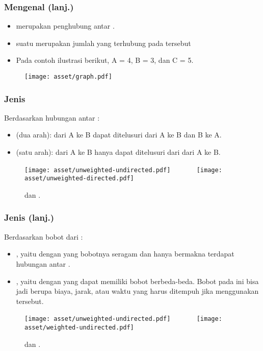 \begin{frame}
\frametitle{Mengenal \fGraph (lanj.)}
\begin{itemize}
  \item \fEdge merupakan penghubung antar \fnode.
  \item \alert{\fDegree} suatu \fnode merupakan jumlah \fedge yang terhubung pada \fnode tersebut
  \item Pada contoh ilustrasi berikut, \fdegree \fnode A = 4, \fdegree \fnode B = 3, dan \fdegree \fnode C = 5.
\end{itemize}
\begin{figure}
  \centering
  \texttt{[image: asset/graph.pdf]}
\end{figure}
\end{frame}

\begin{frame}
\frametitle{Jenis \fGraph}
Berdasarkan hubungan antar \fnode:
\begin{itemize}
  \item {} \fgraph (dua arah): \fedge dari A ke B dapat ditelusuri dari A ke B dan B ke A. 
  \item {} \fgraph (satu arah): \fedge dari A ke B hanya dapat ditelusuri dari dari A ke B.
\end{itemize}
\begin{figure}
  \centering
  \texttt{[image: asset/unweighted-undirected.pdf]}
  \ \ \ \ \ \ %
  \texttt{[image: asset/unweighted-directed.pdf]}
  
   dan  \fgraph.
\end{figure}
\end{frame}

\begin{frame}
\frametitle{Jenis \fGraph (lanj.)}
Berdasarkan bobot dari \fedge:
\begin{itemize}
  \item {} \fGraph, yaitu \fgraph dengan \fedge yang bobotnya seragam dan hanya bermakna terdapat hubungan antar \fnode.
  \item {} \fGraph, yaitu \fgraph dengan \fedge yang dapat memiliki bobot berbeda-beda. Bobot pada \fedge ini bisa jadi berupa biaya, jarak, atau waktu yang harus ditempuh jika menggunakan \fedge tersebut.
\end{itemize}
\begin{figure}
  \centering
  \texttt{[image: asset/unweighted-undirected.pdf]}
  \ \ \ \ \ \ %
  \texttt{[image: asset/weighted-undirected.pdf]}
  
   dan  \fgraph.
\end{figure}
\end{frame}

